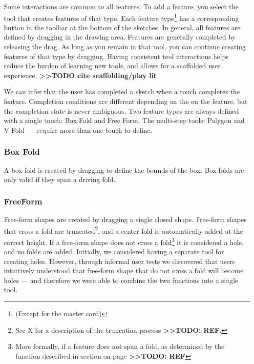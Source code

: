 Some interactions are common to all features. To add a feature, you
select the tool that creates features of that type. Each feature
type\footnote{(Except for the master card)} has a corresponding button
in the toolbar at the bottom of the sketches. In general, all features
are defined by dragging in the drawing area. Features are generally
completed by releasing the drag. As long as you remain in that tool, you
can continue creating features of that type by dragging. Having
consistent tool interactions helps reduce the burden of learning new
tools, and allows for a scaffolded user experience.
\textbf{\textgreater{}\textgreater{}TODO cite scaffolding/play lit}

We can infer that the user has completed a sketch when a touch completes
the feature. Completion conditions are different depending on the on the
feature, but the completion state is never ambiguous. Two feature types
are always defined with a single touch: Box Fold and Free Form. The
multi-step tools: Polygon and V-Fold ---~require more than one touch to
define.

\subsubsection{Box Fold}\label{box-fold}

A box fold is created by dragging to define the bounds of the box. Box
folds are only valid if they span a driving fold.

\subsubsection{FreeForm}\label{freeform}

Free-form shapes are created by dragging a single closed shape.
Free-form shapes that cross a fold are truncated\footnote{See X for a
  description of the truncation process
  \textbf{\textgreater{}\textgreater{}TODO: REF}.}, and a center fold is
automatically added at the correct height. If a free-form shape does not
cross a fold\footnote{More formally, if a feature does not span a fold,
  as determined by the function described in section on page
  \textbf{\textgreater{}\textgreater{}TODO: REF}} it is considered a
hole, and no folds are added. Initially, we considered having a separate
tool for creating holes. However, through informal user tests we
discovered that users intuitively understood that free-form shape that
do not cross a fold will become holes --- and therefore we were able to
combine the two functions into a single tool.

